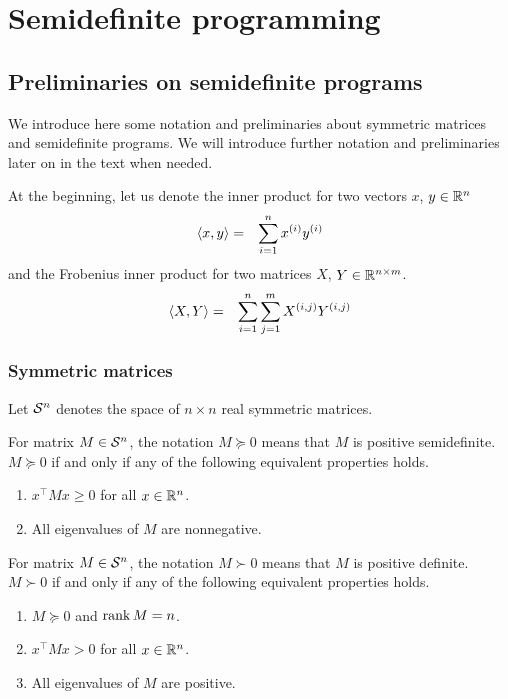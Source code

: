 \chapter{Semidefinite programming}


\section{Preliminaries on semidefinite programs}
We introduce here some notation and preliminaries about symmetric matrices and semidefinite programs.
We will introduce further notation and preliminaries later on in the text when needed.

At the beginning, let us denote the inner product for two vectors $x$, $y \in\mathbb{R}^n$
\begin{eqnarray}
  \langle x, y\rangle &=& \sum_{i=1}^n x^{(i)}y^{(i)}
\end{eqnarray}
and the Frobenius inner product for two matrices $X$, $Y\in\mathbb{R}^{n\times m}$.
\begin{eqnarray}
  \langle X, Y\rangle &=& \sum_{i=1}^n \sum_{j=1}^m X^{(i,j)}Y^{(i,j)}
\end{eqnarray}

\subsection{Symmetric matrices}
Let $\mathcal{S}^n$ denotes the space of $n\times n$ real symmetric matrices.

For matrix $M\in\mathcal{S}^n$, the notation $M \succeq 0$ means that $M$ is positive semidefinite.
$M \succeq 0$ if and only if any of the following equivalent properties holds.
\begin{enumerate}
  \item $x^\top Mx \geq 0$ for all $x \in \mathbb{R}^n$.
  \item All eigenvalues of $M$ are nonnegative.
\end{enumerate}

For matrix $M\in\mathcal{S}^n$, the notation $M \succ 0$ means that $M$ is positive definite.
$M \succ 0$ if and only if any of the following equivalent properties holds.
\begin{enumerate}
  \item $M \succeq 0$ and $\operatorname{rank} M = n$.
  \item $x^\top Mx > 0$ for all $x \in \mathbb{R}^n$.
  \item All eigenvalues of $M$ are positive.
\end{enumerate}

